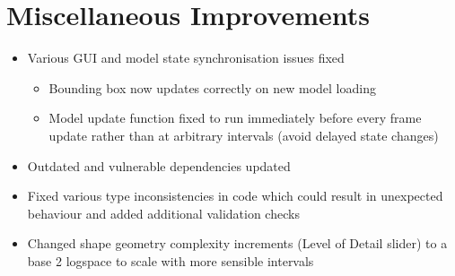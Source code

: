 \section{Miscellaneous Improvements}
\begin{itemize}
  \item Various GUI and model state synchronisation issues fixed
  \begin{itemize}
    \item Bounding box now updates correctly on new model loading
    \item Model update function fixed to run immediately before every frame update rather than at arbitrary intervals (avoid delayed state changes)
\end{itemize}
  \item Outdated and vulnerable dependencies updated
  \item Fixed various type inconsistencies in code which could result in unexpected behaviour and added additional validation checks
  \item Changed shape geometry complexity increments (Level of Detail slider) to a base 2 logspace to scale with more sensible intervals
\end{itemize}
